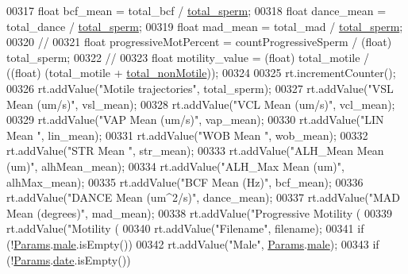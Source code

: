 \begin{DoxyCode}
{{{{00317     \textcolor{keywordtype}{float} bcf\_mean = total\_bcf / \hyperlink{classanalysis_1_1_motility_a2815eaed86c0b1e82e0fa050070546de}{total\_sperm};
00318     \textcolor{keywordtype}{float} dance\_mean = total\_dance / \hyperlink{classanalysis_1_1_motility_a2815eaed86c0b1e82e0fa050070546de}{total\_sperm};
00319     \textcolor{keywordtype}{float} mad\_mean = total\_mad / \hyperlink{classanalysis_1_1_motility_a2815eaed86c0b1e82e0fa050070546de}{total\_sperm};
00320     \textcolor{comment}{// %
00321     \textcolor{keywordtype}{float} progressiveMotPercent = countProgressiveSperm / (float) total\_sperm;
00322     \textcolor{comment}{// %
00323     \textcolor{keywordtype}{float} motility\_value = (float) total\_motile / ((\textcolor{keywordtype}{float}) (total\_motile + 
      \hyperlink{classanalysis_1_1_motility_a12c018b723047f29c67110a7bb1134a8}{total\_nonMotile}));
00324 
00325     rt.incrementCounter();
00326     rt.addValue(\textcolor{stringliteral}{"Motile trajectories"}, total\_sperm);
00327     rt.addValue(\textcolor{stringliteral}{"VSL Mean (um/s)"}, vsl\_mean);
00328     rt.addValue(\textcolor{stringliteral}{"VCL Mean (um/s)"}, vcl\_mean);
00329     rt.addValue(\textcolor{stringliteral}{"VAP Mean (um/s)"}, vap\_mean);
00330     rt.addValue(\textcolor{stringliteral}{"LIN Mean "}, lin\_mean);
00331     rt.addValue(\textcolor{stringliteral}{"WOB Mean "}, wob\_mean);
00332     rt.addValue(\textcolor{stringliteral}{"STR Mean "}, str\_mean);
00333     rt.addValue(\textcolor{stringliteral}{"ALH\_Mean Mean (um)"}, alhMean\_mean);
00334     rt.addValue(\textcolor{stringliteral}{"ALH\_Max Mean (um)"}, alhMax\_mean);
00335     rt.addValue(\textcolor{stringliteral}{"BCF Mean (Hz)"}, bcf\_mean);
00336     rt.addValue(\textcolor{stringliteral}{"DANCE Mean (um^2/s)"}, dance\_mean);
00337     rt.addValue(\textcolor{stringliteral}{"MAD Mean (degrees)"}, mad\_mean);
00338     rt.addValue(\textcolor{stringliteral}{"Progressive Motility (%
00339     rt.addValue(\textcolor{stringliteral}{"Motility (%
00340     rt.addValue(\textcolor{stringliteral}{"Filename"}, filename);
00341     \textcolor{keywordflow}{if} (!\hyperlink{classdata_1_1_params}{Params}.\hyperlink{classdata_1_1_params_a3e07114fb70a676dfe24fad6be8c3c75}{male}.isEmpty())
00342       rt.addValue(\textcolor{stringliteral}{"Male"}, \hyperlink{classdata_1_1_params}{Params}.\hyperlink{classdata_1_1_params_a3e07114fb70a676dfe24fad6be8c3c75}{male});
00343     \textcolor{keywordflow}{if} (!\hyperlink{classdata_1_1_params}{Params}.\hyperlink{classdata_1_1_params_aecbab8174a6d72649883508cf9940d58}{date}.isEmpty())
}}}}}}}}
\end{DoxyCode}
